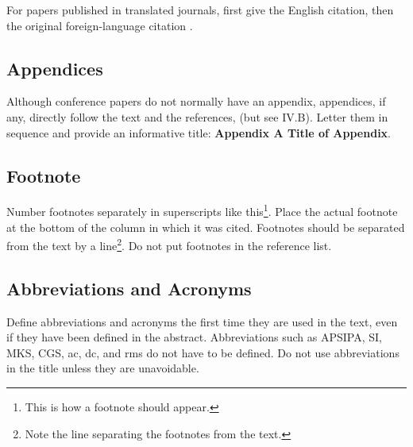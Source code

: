 \documentclass[dvipdfmx,conference,a4paper,nofonttune]{APSIPA}
\begin{document}
For papers published in translated journals, first give the English
citation, then the original foreign-language citation \cite{Yorozu1987}.

\cite{Eason1955,Maxwell1892,Jacobs1963,Elissa,Nicole,Yorozu1987,Young1989}


\subsection{Appendices}
Although conference papers do not normally have an appendix,
appendices, if any, directly follow the text and the references, (but
see IV.B).  Letter them in sequence and provide an informative title:
\textbf{Appendix A Title of Appendix}.

\subsection{Footnote}
Number footnotes separately in superscripts like this\footnote{This is
  how a footnote should appear.}.  Place the actual footnote at the
bottom of the column in which it was cited.  Footnotes should be
separated from the text by a line\footnote{Note the line separating
  the footnotes from the text.}.  Do not put footnotes in the
reference list. 


\subsection{Abbreviations and Acronyms}

Define abbreviations and acronyms the first time they are used in the
text, even if they have been defined in the abstract.  Abbreviations
such as APSIPA, SI, MKS, CGS, ac, dc, and rms do not have to be defined.
Do not use abbreviations in the title unless they are unavoidable.
\end{document}
